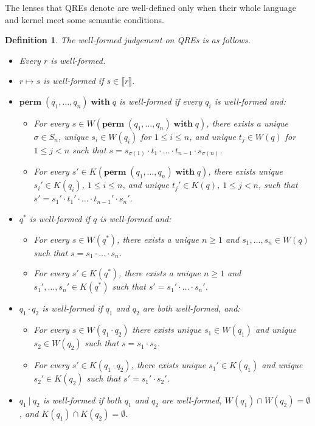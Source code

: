 \documentclass[a4paper,11pt] {article}
\theoremstyle{plain}
\newtheorem{definition}[theorem]{Definition}
\newcommand{\perm}{ \textbf{perm}\; }
\newcommand{\with}{ \;\textbf{with}\; }
\begin{document}
The lenses that QREs denote are well-defined only when their whole
language and kernel meet some semantic conditions.
\begin{definition}
The well-formed judgement on QREs is as follows.
\begin{itemize}
\item Every $r$ is well-formed.
\item $r \mapsto s$ is well-formed if $s \in \llbracket r \rrbracket$.
\item $\perm(q_1, \ldots, q_n) \with q$ is well-formed if every $q_i$ is
  well-formed and:
  \begin{itemize}
  \item For every 
    $s \in W(\perm(q_1, \ldots, q_n) \with q)$, there exists a unique
    $\sigma \in S_n$, unique $s_i \in W(q_i)$ for $1 \leq i \leq n$,
    and unique $t_j \in W(q)$ for $1 \leq j < n$ such that 
    $s = s_{\sigma(1)} \cdot t_1 \cdot \ldots \cdot t_{n-1} \cdot
    s_{\sigma(n)}$.
    
  \item For every $s' \in K(\perm(q_1, \ldots, q_n) \with q)$, there exists
    unique $s_i' \in K(q_i)$, $1 \leq i \leq n$, and unique
    $t_j' \in K(q)$, $1 \leq j < n$, 
    such that $s' = s_1' \cdot t_1' \cdot \ldots \cdot t_{n-1}' \cdot s_n'$.
  \end{itemize}
  
  
\item $q^*$ is well-formed if $q$ is well-formed and:
  \begin{itemize}
  \item For every $s \in W(q^*)$, there exists a unique $n \geq 1$ and
    $s_1, \ldots, s_n \in W(q)$ such that $s = s_1 \cdot \ldots \cdot
    s_n$.
  \item For every $s' \in K(q^*)$, there exists a unique $n \geq 1$ and
    $s_1', \ldots, s_n' \in K(q^*)$ such that
    $s' = s_1' \cdot \ldots \cdot s_n'$.
  \end{itemize}
\item $q_1 \cdot q_2$ is well-formed if $q_1$ and $q_2$ are both well-formed,
  and:
  \begin{itemize}
  \item For every $s \in W(q_1 \cdot q_2)$ there exists unique $s_1 \in W(q_1)$
    and unique $s_2 \in W(q_2)$ such that 
    $s = s_1 \cdot s_2$.
  \item For every $s' \in K(q_1 \cdot q_2)$, there exists unique $s_1' \in K(q_1)$
    and unique $s_2' \in K(q_2)$ such that
    $s' = s_1' \cdot s_2'$.
  \end{itemize}
  
\item $q_1 ~|~ q_2$ is well-formed if both $q_1$ and $q_2$ are well-formed,
  $W(q_1) \cap W(q_2) = \emptyset$, and $K(q_1) \cap K(q_2) = \emptyset$.
\end{itemize}
\end{definition}
\end{document}
